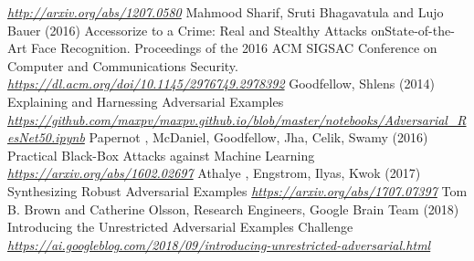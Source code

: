 \begin{vbframe}
{\begin{thebibliography}{99}
\newblock \emph{\url{http://arxiv.org/abs/1207.0580}}
 Mahmood Sharif, Sruti  Bhagavatula and Lujo Bauer (2016)
\newblock Accessorize to a Crime: Real and Stealthy Attacks onState-of-the-Art Face Recognition. Proceedings of the 2016 ACM SIGSAC Conference on Computer and Communications Security.
\newblock \emph{\url{https://dl.acm.org/doi/10.1145/2976749.2978392}}
 Goodfellow, Shlens (2014)
\newblock Explaining and Harnessing Adversarial Examples
\newblock \emph{\url{https://github.com/maxpv/maxpv.github.io/blob/master/notebooks/Adversarial_ResNet50.ipynb}}
 Papernot , McDaniel, Goodfellow, Jha, Celik, Swamy (2016)
\newblock Practical Black-Box Attacks against Machine Learning
\newblock \emph{\url{https://arxiv.org/abs/1602.02697}}
 Athalye , Engstrom, Ilyas, Kwok (2017)
\newblock Synthesizing Robust Adversarial Examples
\newblock \emph{\url{https://arxiv.org/abs/1707.07397}}
 Tom B. Brown and Catherine Olsson, Research Engineers, Google Brain Team (2018)
\newblock 
Introducing the Unrestricted Adversarial Examples Challenge 
\newblock \emph{\url{https://ai.googleblog.com/2018/09/introducing-unrestricted-adversarial.html}}
\end{thebibliography}
}
\end{vbframe}
\endlecture
